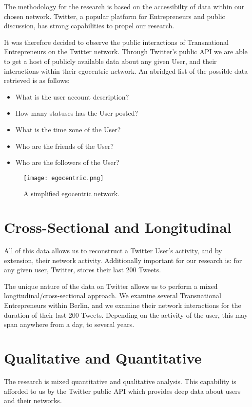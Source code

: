The methodology for the research is based on the accessibilty of data
within our chosen network. Twitter, a popular platform for
Entrepreneurs and public discussion, has strong capabilities to propel
our research.

It was therefore decided to observe the public interactions of
Transnational Entrepreneurs on the Twitter network. Through Twitter's
public API we are able to get a host of publicly available data about
any given User, and their interactions within their egocentric
network. An abridged list of the possible data retrieved is as follows:

\begin{itemize}
\item What is the user account description?
\item How many statuses has the User posted?
\item What is the time zone of the User?
\item Who are the friends of the User?
\item Who are the followers of the User?
\end{itemize}

\begin{figure}[!ht]
  \centering
  \texttt{[image: egocentric.png]}
  \caption{A simplified egocentric network.}
\end{figure}

\section{Cross-Sectional and Longitudinal}
All of this data allows us to reconstruct a Twitter User's activity,
and by extension, their network activity. Additionally important for
our research is: for any given user, Twitter, stores their last
200 Tweets.

The unique nature of the data on Twitter allows us to perform a mixed
longitudinal/cross-sectional approach. We examine several
Transnational Entrepreneurs within Berlin, and we examine their
network interactions for the duration of their last 200
Tweets. Depending on the activity of the user, this may span anywhere
from a day, to several years.

\section{Qualitative and Quantitative}
The research is mixed quantitative and qualitative analysis. This
capability is afforded to us by the Twitter public API which provides
deep data about users and their networks.

